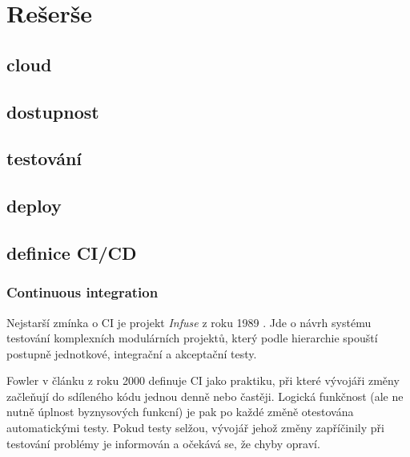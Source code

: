 \chapter{Rešerše}
    \blind[4]

    \section{cloud}
        \blind[2]

    \section{dostupnost}
        \blind[3]

    \section{testování}
        \blind[4]

    \section{deploy}
        \blind[6]

    \section{definice CI/CD}
        \subsection{Continuous integration}
            Nejstarší zmínka o CI je projekt \textit{Infuse} z roku 1989 \cite{kaiser-infuse}. Jde o návrh systému testování komplexních modulárních projektů, který podle hierarchie spouští postupně jednotkové, integrační a akceptační testy.

            Fowler v článku z roku 2000 \cite{fowler-ci-original} definuje CI jako praktiku, při které vývojáři změny začleňují do sdíleného kódu jednou denně nebo častěji. Logická funkčnost (ale ne nutně úplnost byznysových funkcní) je pak po každé změně otestována automatickými testy. Pokud testy selžou, vývojář jehož změny zapříčinily při testování problémy je informován a očekává se, že chyby opraví.

